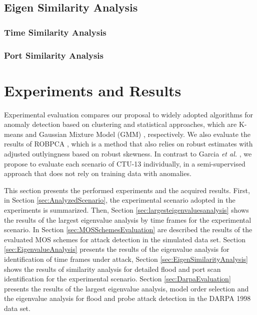 \documentclass[review]{elsarticle}
\begin{document}
\subsection{Eigen Similarity Analysis}
\label{sec:prop_EigenSimilarityAnalysis}

\subsubsection{Time Similarity Analysis}
\label{sec:prop_TimeSimilarityAnalysis}

\subsubsection{Port Similarity Analysis}
\label{sec:prop_PortSimilarityAnalysis}

\section{Experiments and Results}
\label{sec:experimentalresults}

Experimental evaluation compares our proposal to widely adopted algorithms for anomaly detection based on clustering and statistical approaches, which are K-means and Gaussian Mixture Model (GMM) \cite{gaddam2007kmeans,moustafa2019holistic}, respectively. We also evaluate the results of ROBPCA \cite{hubert2005robpca}, which is a method that also relies on robust estimates with adjusted outlyingness based on robust skewness. In contrast to Garcia \emph{et al.} \cite{garcia2014empirical}, we propose to evaluate each scenario of CTU-13 individually, in a semi-supervised approach that does not rely on training data with anomalies.

This section presents the performed experiments and the acquired results. First, in Section \ref{sec:AnalyzedScenario}, the experimental scenario adopted in the experiments is summarized. Then, Section \ref{sec:largesteigenvaluesanalysis} shows the results of the largest eigenvalue analysis by time frames for the experimental scenario. In Section \ref{sec:MOSSchemesEvaluation} are described the results of the evaluated MOS schemes for attack detection in the simulated data set. Section \ref{sec:EigenvalueAnalysis} presents the results of the eigenvalue analysis for identification of time frames under attack, Section \ref{sec:EigenSimilarityAnalysis} shows the results of similarity analysis for detailed flood and port scan identification for the experimental scenario. Section \ref{sec:DarpaEvaluation} presents the results of the largest eigenvalue analysis, model order selection and the eigenvalue analysis for flood and probe attack detection in the DARPA 1998 data set.
\end{document}
